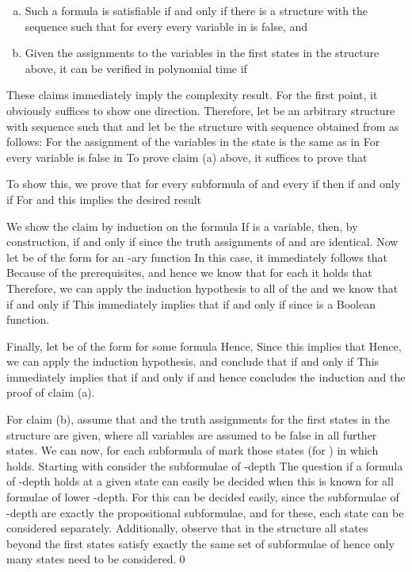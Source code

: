     \begin{enumerate}[(a)]
	\item Such a formula  is satisfiable if and only if there is a structure  with the sequence  such that for every  every variable in  is false, and 
        \item Given the assignments to the variables in the first  states in the structure above, it can be verified in polynomial time if 
    \end{enumerate}

    These claims immediately imply the complexity result. For the first point, it obviously suffices to show one direction. Therefore, let  be an arbitrary structure with sequence  such that  and let  be the structure with sequence  obtained from  as follows: For  the assignment of the variables in the state  is the same as in  For  every variable is false in  To prove claim (a) above, it suffices to prove that 

    To show this, we prove that for every subformula  of  and every  if  then  if and only if  For  and  this implies the desired result 

    We show the claim by induction on the formula  If  is a variable, then, by construction,  if and only if  since the truth assignments of  and  are identical. Now let  be of the form  for an -ary function  In this case, it immediately follows that   Because of the prerequisites,  and hence we know that for each  it holds that  Therefore, we can apply the induction hypothesis to all of the  and we know that  if and only if  This immediately implies that  if and only if  since  is a Boolean function.

    Finally, let  be of the form  for some formula  Hence,  Since  this implies that  Hence, we can apply the induction hypothesis, and conclude that  if and only if  This immediately implies that  if and only if  and hence concludes the induction and the proof of claim (a).

    For claim (b), assume that  and the truth assignments for the first  states in the structure  are given, where all variables are assumed to be false in all further states. We can now, for each subformula  of  mark those states  (for ) in which  holds. Starting with  consider the subformulae of -depth  The question if a formula of -depth  holds at a given state can easily be decided when this is known for all formulae of lower -depth. For  this can be decided easily, since the subformulae of -depth  are exactly the propositional subformulae, and for these, each state can be considered separately. Additionally, observe that in the structure  all states beyond the first  states satisfy exactly the same set of subformulae of  hence only  many states need to be considered.\qed
    \fi


